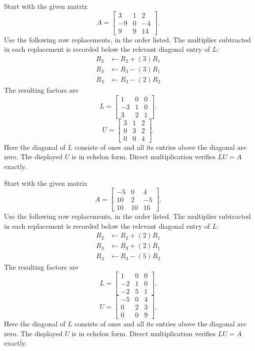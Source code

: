 Start with the given matrix
\[A=\left[\begin{matrix}3 & 1 & 2\\-9 & 0 & -4\\9 & 9 & 14\end{matrix}\right].\]
Use the following row replacements, in the order listed. The multiplier
subtracted in each replacement is recorded below the relevant diagonal
entry of $L$:
\begin{align*}R_{2}&\leftarrow R_{2}+(3)R_{1}\\
R_{3}&\leftarrow R_{3}-(3)R_{1}\\
R_{3}&\leftarrow R_{3}-(2)R_{2}\end{align*}The resulting factors are
\[L=\left[\begin{matrix}1 & 0 & 0\\-3 & 1 & 0\\3 & 2 & 1\end{matrix}\right].\]
\[U=\left[\begin{matrix}3 & 1 & 2\\0 & 3 & 2\\0 & 0 & 4\end{matrix}\right].\]Here the diagonal of $L$ consists of ones and all its entries above
the diagonal are zero. The displayed $U$ is in echelon form.
Direct multiplication verifies $LU=A$ exactly.

Start with the given matrix
\[A=\left[\begin{matrix}-5 & 0 & 4\\10 & 2 & -5\\10 & 10 & 16\end{matrix}\right].\]
Use the following row replacements, in the order listed. The multiplier
subtracted in each replacement is recorded below the relevant diagonal
entry of $L$:
\begin{align*}R_{2}&\leftarrow R_{2}+(2)R_{1}\\
R_{3}&\leftarrow R_{3}+(2)R_{1}\\
R_{3}&\leftarrow R_{3}-(5)R_{2}\end{align*}The resulting factors are
\[L=\left[\begin{matrix}1 & 0 & 0\\-2 & 1 & 0\\-2 & 5 & 1\end{matrix}\right].\]
\[U=\left[\begin{matrix}-5 & 0 & 4\\0 & 2 & 3\\0 & 0 & 9\end{matrix}\right].\]Here the diagonal of $L$ consists of ones and all its entries above
the diagonal are zero. The displayed $U$ is in echelon form.
Direct multiplication verifies $LU=A$ exactly.

